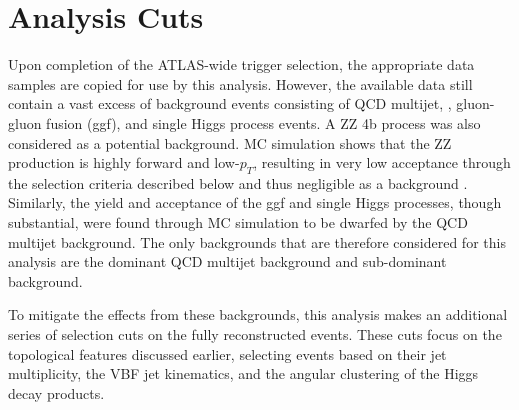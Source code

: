 

\FloatBarrier
\section{Analysis Cuts} \label{sec:analysis_cuts}

        Upon completion of the ATLAS-wide trigger selection,
            the appropriate data samples are copied for use by this analysis.
        However, the available data still contain a vast excess of background events
            consisting of QCD multijet, \ttbar, gluon-gluon fusion (ggf), and single Higgs process events.
        A ZZ \to 4b process was also considered as a potential background.
        MC simulation shows that the ZZ production is highly forward and low-$p_T$,
            resulting in very low acceptance through the selection criteria described below
            and thus negligible as a background \cite{vbf_hh_4b_resonant_2020_int}.
        Similarly, the yield and acceptance of the ggf and single Higgs processes, though substantial,
            were found through MC simulation to be dwarfed by the QCD multijet background\cite{hh4b_2021_int_note}.
        The only backgrounds that are therefore considered for this analysis are the
            dominant QCD multijet background and sub-dominant \ttbar background.

        To mitigate the effects from these backgrounds,
            this analysis makes an additional series of selection cuts on the fully reconstructed events.
        These cuts focus on the topological features discussed earlier,
            selecting events based on their jet multiplicity,
            the VBF jet kinematics,
            and the angular clustering of the Higgs decay products.

